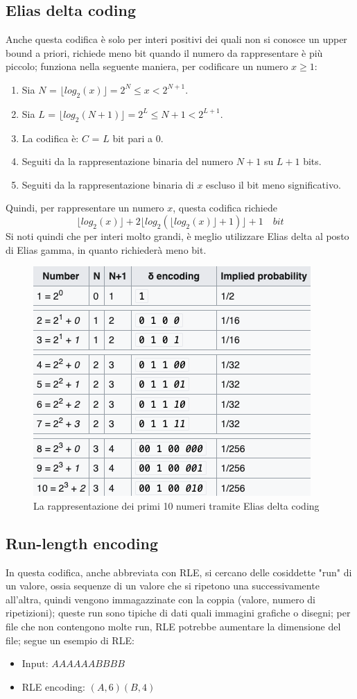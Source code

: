 \documentclass[12pt,a4paper]{article}
\begin{document}
\subsection{Elias delta coding}
Anche questa codifica è solo per interi positivi dei quali non si conosce un upper bound a priori, richiede meno bit quando il numero da rappresentare è più piccolo; funziona nella seguente maniera, per codificare un numero $x \geq 1$:
\begin{enumerate}
\item Sia $N$ = $\lfloor log_{2} (x) \rfloor = 2^N \leq x < 2^{N+1}$.
\item Sia $L$ = $\lfloor log_{2} (N+1) \rfloor = 2^L \leq N+1 < 2^{L+1}$.
\item La codifica è: $C$ = $L$ bit pari a $0$.
\item Seguiti da la rappresentazione binaria del numero $N+1$ su $L+1$ bits.
\item Seguiti da la rappresentazione binaria di $x$ escluso il bit meno significativo.
\end{enumerate}
Quindi, per rappresentare un numero $x$, questa codifica richiede $$\lfloor log_{2} (x) \rfloor + 2 \lfloor log_{2} (\lfloor log_{2} (x) \rfloor + 1) \rfloor + 1 \quad bit$$
Si noti quindi che per interi molto grandi, è meglio utilizzare Elias delta al posto di Elias gamma, in quanto richiederà meno bit.
\begin{figure}[h]
	\centering
	\includegraphics[width=0.5\linewidth]{img/elias_delta}
	\caption{La rappresentazione dei primi 10 numeri tramite Elias delta coding}
	\label{fig:elias_delta}
\end{figure}

\subsection{Run-length encoding}
In questa codifica, anche abbreviata con RLE, si cercano delle cosiddette "run" di un valore, ossia sequenze di un valore che si ripetono una successivamente all'altra, quindi vengono immagazzinate con la coppia (valore, numero di ripetizioni); queste run sono tipiche di dati quali immagini grafiche o disegni; per file che non contengono molte run, RLE potrebbe aumentare la dimensione del file; segue un esempio di RLE:
\begin{itemize}
\item Input: $AAAAAABBBB$
\item RLE encoding: $(A, 6)(B, 4)$
\end{itemize}
\end{document}
